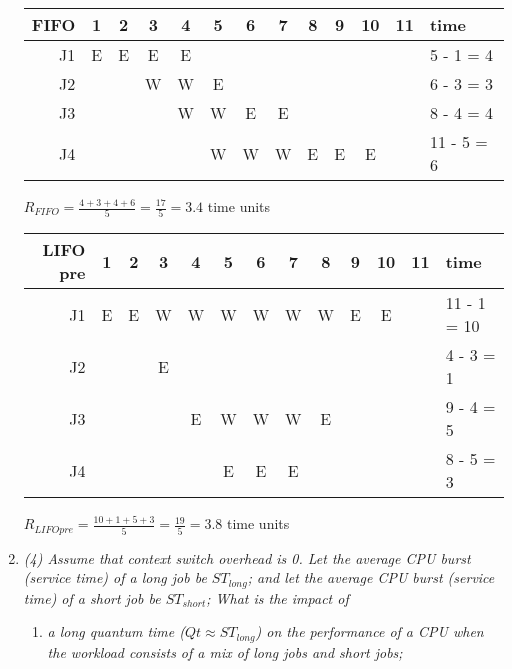 \documentclass[letterpaper,11pt]{article}
\begin{document}
\begin{enumerate}
\begin{center}
  \begin{tabular}{ r || c | c | c | c | c | c | c | c | c | c | c || l }
    \hline
    FIFO & 1 & 2 & 3 & 4 & 5 & 6 & 7 & 8 & 9 & 10 & 11 & time \\ \hline
    \hline
    J1   & E & E & E & E &   &   &   &   &   &    &    & 5 - 1 = 4 \\ \hline
    J2   &   &   & W & W & E &   &   &   &   &    &    & 6 - 3 = 3 \\ \hline
    J3   &   &   &   & W & W & E & E &   &   &    &    & 8 - 4 = 4 \\ \hline
    J4   &   &   &   &   & W & W & W & E & E & E  &    & 11 - 5 = 6 \\ \hline
    \hline
  \end{tabular}
\end{center}

$R_{FIFO} = \frac{4 + 3 + 4 + 6}{5} = \frac{17}{5} = 3.4$ time units

\begin{center}
  \begin{tabular}{ r || c | c | c | c | c | c | c | c | c | c | c || l }
    \hline
    LIFO pre & 1 & 2 & 3 & 4 & 5 & 6 & 7 & 8 & 9 & 10 & 11 & time \\ \hline
    \hline
    J1       & E & E & W & W & W & W & W & W & E & E  &    & 11 - 1 = 10 \\ \hline
    J2       &   &   & E &   &   &   &   &   &   &    &    & 4 - 3 = 1 \\ \hline
    J3       &   &   &   & E & W & W & W & E &   &    &    & 9 - 4 = 5 \\ \hline
    J4       &   &   &   &   & E & E & E &   &   &    &    & 8 - 5 = 3 \\ \hline
    \hline
  \end{tabular}
\end{center}

$R_{LIFO pre} = \frac{10 + 1 + 5 + 3}{5} = \frac{19}{5} = 3.8$ time units
\item \emph{(4) Assume that context switch overhead is 0. Let the average CPU burst (service time) of a long job be $ST_{long}$; and let the average CPU burst (service time) of a short job be $ST_{short}$; What is the impact of}

\begin{enumerate}
\item \emph{a long quantum time ($Qt \approx ST_{long}$) on the performance of a CPU when the workload consists of a mix of long jobs and short jobs;}


\end{enumerate}
\end{enumerate}
\end{document}
